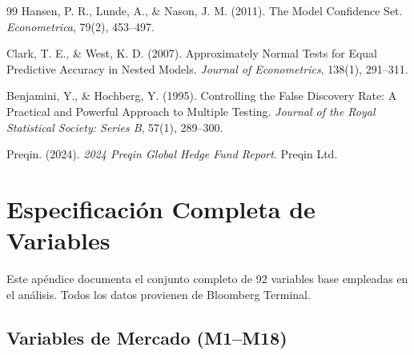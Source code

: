 \documentclass[11pt,a4paper]{article}
\begin{document}
\begin{thebibliography}{99}
Hansen, P. R., Lunde, A., \& Nason, J. M. (2011).
\newblock The Model Confidence Set.
\newblock \textit{Econometrica}, 79(2), 453--497.

Clark, T. E., \& West, K. D. (2007).
\newblock Approximately Normal Tests for Equal Predictive Accuracy in Nested Models.
\newblock \textit{Journal of Econometrics}, 138(1), 291--311.

Benjamini, Y., \& Hochberg, Y. (1995).
\newblock Controlling the False Discovery Rate: A Practical and Powerful Approach to Multiple Testing.
\newblock \textit{Journal of the Royal Statistical Society: Series B}, 57(1), 289--300.


Preqin. (2024).
\newblock \textit{2024 Preqin Global Hedge Fund Report}.
\newblock Preqin Ltd.

\end{thebibliography}

\newpage
\appendix

\section{Especificación Completa de Variables}

Este apéndice documenta el conjunto completo de 92 variables base empleadas en el análisis. Todos los datos provienen de Bloomberg Terminal.

\subsection{Variables de Mercado (M1--M18)}
\end{document}
